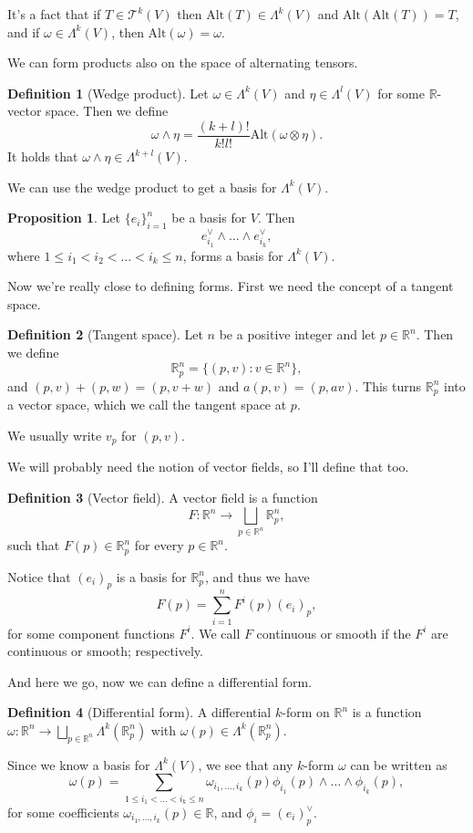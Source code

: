 \documentclass{article}
\theoremstyle{definition}
\newtheorem{defi}{Definition}
\newtheorem{prop}{Proposition}
\begin{document}
It's a fact that if $T\in\mathcal{T}^k(V)$ then $\mathrm{Alt}(T)\in\Lambda^k(V)$ and $\mathrm{Alt}(\mathrm{Alt}(T))=T$, and if $\omega\in\Lambda^k(V)$, then $\mathrm{Alt}(\omega)=\omega$.

We can form products also on the space of alternating tensors.
\begin{defi}[Wedge product]
  Let $\omega\in\Lambda^k(V)$ and $\eta\in\Lambda^l(V)$ for some $\mathbb{R}$-vector space. Then we define
  \[\omega\land\eta=\frac{(k+l)!}{k!l!}\mathrm{Alt}(\omega\otimes\eta).\]
  It holds that $\omega\land\eta\in\Lambda^{k+l}(V)$.
\end{defi}
We can use the wedge product to get a basis for $\Lambda^k(V)$.
\begin{prop}
  Let $\{e_i\}_{i=1}^n$ be a basis for $V$. Then
  \[e_{i_1}^\vee\land\dots\land e_{i_k}^\vee,\]
  where $1\leq i_1<i_2<\dots<i_k\leq n$, forms a basis for $\Lambda^k(V)$.
\end{prop}

Now we're really close to defining forms. First we need the concept of a tangent space.
\begin{defi}[Tangent space]
  Let $n$ be a positive integer and let $p\in\mathbb{R}^n$. Then we define
  \[\mathbb{R}^n_p=\{(p,v):v\in\mathbb{R}^n\},\]
  and $(p,v)+(p,w)=(p,v+w)$ and $a(p,v)=(p,av)$. This turns $\mathbb{R}^n_p$ into a vector space, which we call the tangent space at $p$.

  We usually write $v_p$ for $(p,v)$.
\end{defi}
We will probably need the notion of vector fields, so I'll define that too.
\begin{defi}[Vector field]
  A vector field is a function
  \[F:\mathbb{R}^n\to\bigsqcup_{p\in\mathbb{R}^n}\mathbb{R}^n_p,\]
  such that $F(p)\in\mathbb{R}^n_p$ for every $p\in\mathbb{R}^n$.
\end{defi}
Notice that $(e_i)_p$ is a basis for $\mathbb{R}^n_p$, and thus we have
\[F(p)=\sum_{i=1}^nF^i(p)(e_i)_p,\]
for some component functions $F^i$. We call $F$ continuous or smooth if the $F^i$ are continuous or smooth; respectively.

And here we go, now we can define a differential form.
\begin{defi}[Differential form]
  A differential $k$-form on $\mathbb{R}^n$ is a function $\omega:\mathbb{R}^n\to\bigsqcup_{p\in\mathbb{R}^n}\Lambda^k(\mathbb{R}^n_p)$ with $\omega(p)\in\Lambda^k(\mathbb{R}^n_p)$.
\end{defi}
Since we know a basis for $\Lambda^k(V)$, we see that any $k$-form $\omega$ can be written as
\[\omega(p)=\sum_{1\leq i_1<\dots<i_k\leq n}\omega_{i_1,\dots,i_k}(p)\phi_{i_1}(p)\land\dots\land\phi_{i_k}(p),\]
for some coefficients $\omega_{i_1,\dots,i_k}(p)\in\mathbb{R}$, and $\phi_i=(e_i)_p^\vee$.
\end{document}
